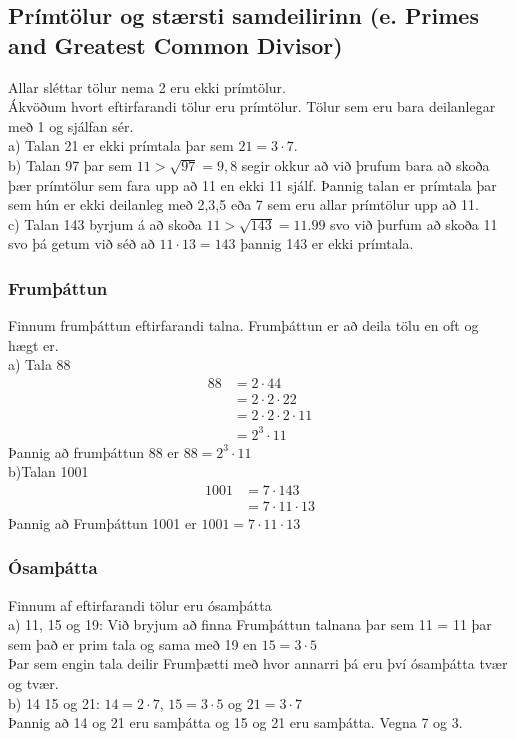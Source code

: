 \subsection{Prímtölur og stærsti samdeilirinn (e. Primes and Greatest Common Divisor)}
Allar sléttar tölur nema 2 eru ekki prímtölur.\\
Ákvöðum hvort eftirfarandi tölur eru prímtölur. Tölur sem eru bara deilanlegar með 1 og sjálfan sér.\\
a) Talan 21 er ekki prímtala þar sem $21 = 3 \cdot 7$.\\
b) Talan 97 þar sem $11 > \sqrt{97} = 9,8$ segir okkur að við þrufum bara að skoða þær prímtölur sem fara upp að 11 en ekki 11 sjálf. Þannig talan er prímtala þar sem hún er ekki deilanleg með 2,3,5 eða 7 sem eru allar prímtölur upp að 11.\\
c) Talan 143 byrjum á að skoða $11 > \sqrt{143} = 11.99$ svo við þurfum að skoða 11 svo þá getum við séð að $11 \cdot 13 = 143$ þannig 143 er ekki prímtala.

\subsubsection{Frumþáttun}
Finnum frumþáttun eftirfarandi talna. Frumþáttun er að deila tölu en oft og hægt er.\\
a) Tala 88 
\vspace*{-1em}\begin{align*}
    88 &= 2 \cdot 44 \\
    &= 2 \cdot 2 \cdot 22 \\
    &= 2 \cdot 2 \cdot 2 \cdot 11 \\
    &= 2^3 \cdot 11 
\end{align*}
Þannig að frumþáttun 88 er $88 = 2^3 \cdot 11$\\
b)Talan 1001 
\vspace*{-1em}\begin{align*}
    1001 &= 7 \cdot 143 \\
    &= 7 \cdot 11 \cdot 13
\end{align*}
Þannig að Frumþáttun 1001 er $1001 = 7 \cdot 11 \cdot 13$
\subsubsection{Ósamþátta}
Finnum af eftirfarandi tölur eru ósamþátta\\
a) 11, 15 og 19: Við bryjum að finna Frumþáttun talnana þar sem 11 = 11 þar sem það er prim tala og sama með 19 en $15 = 3 \cdot 5$\\
Þar sem engin tala deilir Frumþætti með hvor annarri þá eru því ósamþátta tvær og tvær.\\
b) 14 15 og 21: $14 = 2 \cdot 7$, $ 15=3\cdot 5 $ og $21 = 3\cdot 7$\\
Þannig að 14 og 21 eru samþátta og 15 og 21 eru samþátta. Vegna 7 og 3.\\
\newpage
